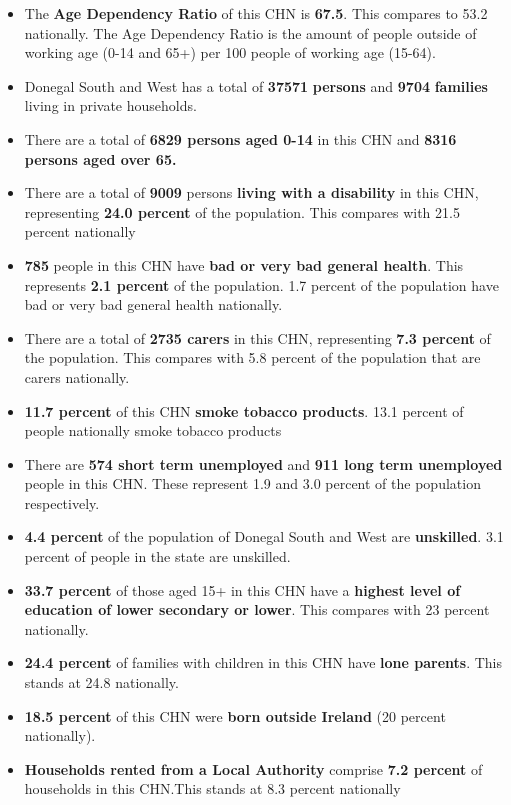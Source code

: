 \documentclass{article}
\begin{document}
\begin{itemize}

\item The \textbf{Age Dependency Ratio} of this CHN is  \textbf{67.5}. This compares to 53.2 nationally. The Age Dependency Ratio is the amount of people outside of working age (0-14 and 65+) per 100 people of working age (15-64). 

\item Donegal South and West has a total of \textbf{\num{37571}} \textbf{persons} and  \textbf{\num{9704}} \textbf{families} living in private households.

\item There are a total of \textbf{\num{6829} persons aged 0-14} in this CHN and \textbf{\num{8316} persons aged over 65.} 

\item There are a total of \textbf{\num{9009}} persons \textbf{living with a disability} in this CHN, representing \textbf{24.0 percent} of the population. This compares with  21.5 percent nationally

\item \textbf{\num{785}} people in this CHN have \textbf{bad or very bad general health}. This represents \textbf{2.1 percent} of the population. 1.7 percent of the population have bad or very bad general health nationally. 

\item There are a total of \textbf{\num{2735} carers} in this CHN, representing \textbf{7.3 percent} of the population. This compares with 5.8 percent of the population that are carers nationally. 

\item \textbf{11.7 percent} of this CHN \textbf{smoke tobacco products}. 13.1 percent of people nationally smoke tobacco products

\item There are \textbf{\num{574} short term unemployed} and \textbf{\num{911} long term unemployed} people in this CHN. These represent 1.9 and 3.0 percent of the population respectively.

\item  \textbf{4.4 percent} of the population of Donegal South and West are \textbf{unskilled}. 3.1 percent of people in the state are unskilled.

\item \textbf{33.7 percent} of those aged 15+ in this CHN have a \textbf{highest level of education of lower secondary or lower}. This compares with 23 percent nationally. 

\item \textbf{24.4 percent} of families with children in this CHN have \textbf{lone parents}. This stands at 24.8 nationally.

\item \textbf{18.5 percent} of this CHN were \textbf{born outside Ireland} (20 percent nationally).

\item \textbf{Households rented from a Local Authority} comprise \textbf{7.2 percent} of households in this CHN.This stands at 8.3 percent nationally

\end{itemize}
\end{document}

